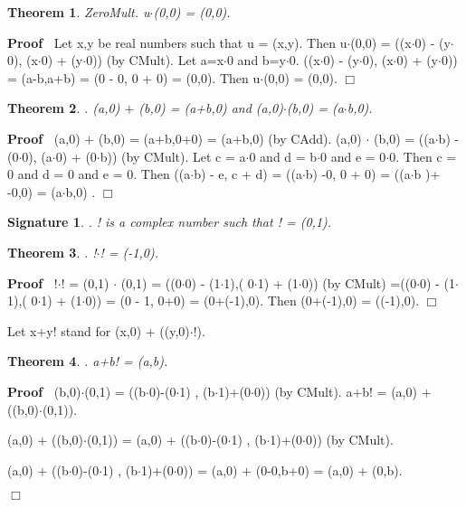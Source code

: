 \documentclass{article}
\newenvironment{forthel}{\begin{leftbar}}{\end{leftbar}}
\newenvironment{proof}{\noindent\textbf{Proof\ }}{\hspace*{\fill}$\Box$\medskip}
\newtheorem{theorem}{Theorem}
\newtheorem{signature}{Signature}
\newcommand{\cmul}{\cdot}
\newcommand{\cadd}{+}
\begin{document}
\begin{forthel}
\begin{theorem}
 ZeroMult. u$\cmul$(0,0) = (0,0).
\end{theorem}\begin{proof}
 Let x,y be real numbers such that u = (x,y). Then u$\cmul$(0,0) = ((x$\cdot$0) - (y$\cdot$0), (x$\cdot$0) + (y$\cdot$0)) (by CMult). 
Let a=x$\cdot$0 and b=y$\cdot$0.
((x$\cdot$0) - (y$\cdot$0), (x$\cdot$0) + (y$\cdot$0)) = (a-b,a+b) = (0 - 0, 0 + 0) = (0,0). 
Then u$\cmul$(0,0) = (0,0). 
\end{proof}


\begin{theorem}
. (a,0) $\cadd$ (b,0) = (a+b,0) and (a,0)$\cmul$(b,0) = (a$\cdot$b,0).
\end{theorem}\begin{proof}
 	(a,0) $\cadd$ (b,0) = (a+b,0+0) = (a+b,0) (by CAdd).
(a,0) $\cmul$ (b,0) = ((a$\cdot$b) - (0$\cdot$0), (a$\cdot$0) + (0$\cdot$b)) (by CMult).
Let c = a$\cdot$0 and d = b$\cdot$0 and e = 0$\cdot$0.
Then c = 0 and d = 0 and e = 0.
Then ((a$\cdot$b) - e, c + d) = ((a$\cdot$b) -0, 0 + 0) = ((a$\cdot$b )+ -0,0) = (a$\cdot$b,0) . \end{proof}


\begin{signature}. ! is a complex number such that ! = (0,1).

\end{signature}

\begin{theorem}
. !$\cmul$! = (-1,0).
\end{theorem}\begin{proof}
 	!$\cmul$! = (0,1) $\cmul$ (0,1) 
= ((0$\cdot$0) - (1$\cdot$1),( 0$\cdot$1) + (1$\cdot$0)) (by CMult)
=((0$\cdot$0) - (1$\cdot$1),( 0$\cdot$1) + (1$\cdot$0)) 
= (0 - 1, 0+0) 
= (0+(-1),0).
Then (0+(-1),0) = ((-1),0). 
\end{proof}


Let x+y! stand for (x,0) $\cadd$ ((y,0)$\cmul$!).


\begin{theorem}
. a+b! = (a,b).
\end{theorem}\begin{proof}
 	(b,0)$\cmul$(0,1) = ((b$\cdot$0)-(0$\cdot$1) , (b$\cdot$1)+(0$\cdot$0)) (by CMult).
a+b! = (a,0) $\cadd$ ((b,0)$\cmul$(0,1)). 

(a,0) $\cadd$ ((b,0)$\cmul$(0,1))
= (a,0) $\cadd$ ((b$\cdot$0)-(0$\cdot$1) , (b$\cdot$1)+(0$\cdot$0)) (by CMult).

(a,0) $\cadd$ ((b$\cdot$0)-(0$\cdot$1) , (b$\cdot$1)+(0$\cdot$0))
= (a,0) $\cadd$ (0-0,b+0) 
= (a,0) $\cadd$ (0,b).


\end{proof}
\end{forthel}
\end{document}
